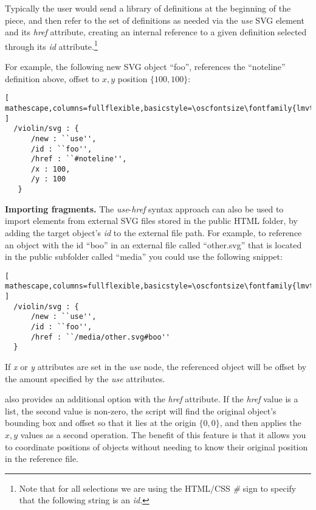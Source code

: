 Typically the user would send a library of definitions at the beginning of the piece, and then refer to the set of definitions as needed via the \textit{use} SVG element and its \textit{href} attribute, creating an internal reference to a given definition selected through its \textit{id} attribute.\footnote{Note that for all selections we are using the HTML/CSS \textit{\#} sign to specify that the following string is an \textit{id}.}

For example, the following new SVG object ``foo'', references the ``noteline'' definition above, offset to ${x,y}$ position $\{100,100\}$:

\begin{minipage}{\linewidth}
\begin{lstlisting}[ mathescape,columns=fullflexible,basicstyle=\oscfontsize\fontfamily{lmvtt}\selectfont ]
  /violin/svg : {
      /new : ``use'',
      /id : ``foo'',
      /href : ``#noteline'',
      /x : 100,
      /y : 100
   }
 \end{lstlisting}
\end{minipage}

\medskip
\noindent
\textbf{Importing fragments.} 
The \textit{use}-\textit{href} syntax approach can also be used to import elements from external SVG files stored in the public HTML folder, by adding the target object's \textit{id} to the external file path.
For example, to reference an object with the id ``boo'' in an external file called ``other.svg'' that is located in the public subfolder called ``media'' you could use the following snippet:

\begin{lstlisting}[ mathescape,columns=fullflexible,basicstyle=\oscfontsize\fontfamily{lmvtt}\selectfont ]
  /violin/svg : {
      /new : ``use'',
      /id : ``foo'',
      /href : ``/media/other.svg#boo''
  }
 \end{lstlisting}

If \textit{x} or \textit{y} attributes are set in the \textit{use} node, the referenced object will be offset by the amount specified by the  \textit{use} attributes.

\drawsocket also provides an additional option with the \textit{href} attribute. If the \textit{href} value is a list, the second value is non-zero, the script will find the original object's bounding box and offset so that it lies at the origin $\{0,0\}$, and then applies the ${x,y}$ values as a second operation. The benefit of this feature is that it allows you to coordinate positions of objects without needing to know their original position in the reference file.

